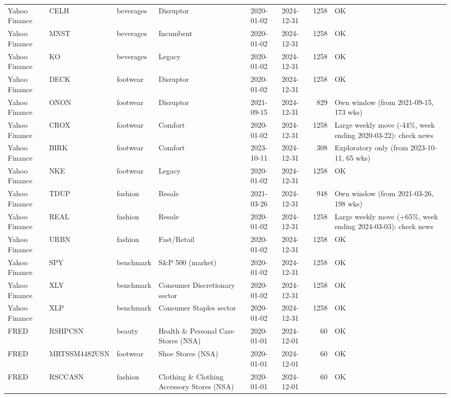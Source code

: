 \begin{table}[t]
\begin{tabular}{llllllrl}
Yahoo Finance & CELH & beverages & Disruptor & 2020-01-02 & 2024-12-31 & 1258 & OK \\
Yahoo Finance & MNST & beverages & Incumbent & 2020-01-02 & 2024-12-31 & 1258 & OK \\
Yahoo Finance & KO & beverages & Legacy & 2020-01-02 & 2024-12-31 & 1258 & OK \\
Yahoo Finance & DECK & footwear & Disruptor & 2020-01-02 & 2024-12-31 & 1258 & OK \\
Yahoo Finance & ONON & footwear & Disruptor & 2021-09-15 & 2024-12-31 & 829 & Own window (from 2021-09-15, 173 wks) \\
Yahoo Finance & CROX & footwear & Comfort & 2020-01-02 & 2024-12-31 & 1258 & Large weekly move (-44\%, week ending 2020-03-22): check news \\
Yahoo Finance & BIRK & footwear & Comfort & 2023-10-11 & 2024-12-31 & 308 & Exploratory only (from 2023-10-11, 65 wks) \\
Yahoo Finance & NKE & footwear & Legacy & 2020-01-02 & 2024-12-31 & 1258 & OK \\
Yahoo Finance & TDUP & fashion & Resale & 2021-03-26 & 2024-12-31 & 948 & Own window (from 2021-03-26, 198 wks) \\
Yahoo Finance & REAL & fashion & Resale & 2020-01-02 & 2024-12-31 & 1258 & Large weekly move (+65\%, week ending 2024-03-03): check news \\
Yahoo Finance & URBN & fashion & Fast/Retail & 2020-01-02 & 2024-12-31 & 1258 & OK \\
Yahoo Finance & SPY & benchmark & S\&P 500 (market) & 2020-01-02 & 2024-12-31 & 1258 & OK \\
Yahoo Finance & XLY & benchmark & Consumer Discretionary sector & 2020-01-02 & 2024-12-31 & 1258 & OK \\
Yahoo Finance & XLP & benchmark & Consumer Staples sector & 2020-01-02 & 2024-12-31 & 1258 & OK \\
FRED & RSHPCSN & beauty & Health \& Personal Care Stores (NSA) & 2020-01-01 & 2024-12-01 & 60 & OK \\
FRED & MRTSSM4482USN & footwear & Shoe Stores (NSA) & 2020-01-01 & 2024-12-01 & 60 & OK \\
FRED & RSCCASN & fashion & Clothing \& Clothing Accessory Stores (NSA) & 2020-01-01 & 2024-12-01 & 60 & OK \\
\bottomrule
\end{tabular}
\end{table}
